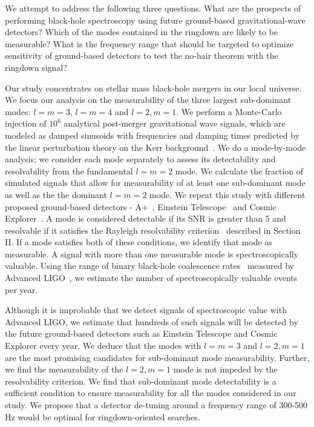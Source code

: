 We attempt to address the following three questions. What are the prospects of performing black-hole spectroscopy using future ground-based gravitational-wave detectors? Which of the modes contained in the ringdown are likely to be measurable? What is the frequency range that should be targeted to optimize sensitivity of ground-based detectors to test the no-hair theorem with the ringdown signal?

Our study concentrates on stellar mass black-hole mergers in our local universe. We focus our analysis on the measurability of the three largest sub-dominant modes: $l=m=3$, $l=m=4$ and $l=2, m=1$. We perform a Monte-Carlo injection of $10^{6}$ analytical post-merger gravitational wave signals, which are modeled as damped sinusoids with frequencies and damping times predicted by the linear perturbation theory on the Kerr background~\cite{Leaver285}. We do a mode-by-mode analysis; we consider each mode separately to assess its detectability and resolvability from the fundamental $l=m=2$ mode. We calculate the fraction of simulated signals that allow for measurability of at least one sub-dominant mode as well as the the dominant $l=m=2$ mode. We repeat this study with different proposed ground-based detectors - A+~\cite{2015PhRvD..91f2005M}, Einstein Telescope~\cite{0264-9381-28-9-094013} and Cosmic Explorer~\cite{Evans:2016dc}. A mode is considered detectable if its SNR is greater than 5 and resolvable if it satisfies the Rayleigh resolvability criterion~\cite{1453789,1038162} described in Section II. If a mode satisfies both of these conditions, we identify that mode as measurable. A signal with more than one measurable mode is spectroscopically valuable. Using the range of binary black-hole coalescence rates~\cite{LIGO:2016Rates} measured by Advanced LIGO~\cite{2015CQGra..32g4001L}, we estimate the number of spectroscopically valuable events per year.

Although it is improbable that we detect signals of spectroscopic value with Advanced LIGO, we estimate that hundreds of such signals will be detected by the future ground-based detectors such as Einstein Telescope and Cosmic Explorer every year. We deduce that the modes with $l=m=3$ and $l=2, m=1$ are the most promising candidates for sub-dominant mode measurability. Further, we find the measurability of the $l=2, m=1$ mode is not impeded by the resolvability criterion. We find that sub-dominant mode detectability is a sufficient condition to ensure measurability for all the modes considered in our study. We propose that a detector de-tuning around a frequency range of 300-500 Hz would be optimal for ringdown-oriented searches. 

